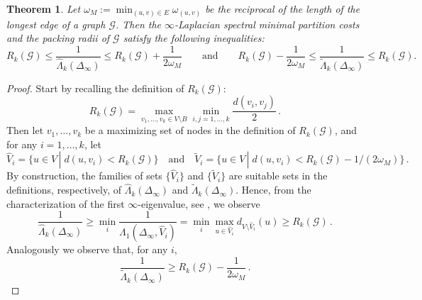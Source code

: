 \documentclass[10pt,a4paper]{amsart}
\newtheorem{theorem}{Theorem}
\newcommand{\Gc}{\mathcal{G}}
\newcommand{\boundary}{B}
\newcommand{\edgelength}{\omega}
\newcommand{\edgeset}{E}
\newcommand{\inflap}{\Delta_{\infty}}
\newcommand{\internalnodes}{\nodeset\setminus\boundary}
\newcommand{\nodeset}{V}
\begin{document}
\begin{theorem}\label{Thm_spectral_min_partitions}
Let $\edgelength_M:=\min_{(u,v)\in\edgeset} \edgelength_{(u,v)}$ be the reciprocal of the length of the longest edge of a graph $\Gc$. Then the $\infty$-Laplacian spectral minimal partition costs and the packing radii of $\Gc$ satisfy the following inequalities:  
%
    $$
    R_k(\Gc) 
 \leq \frac{1}{\widehat{\Lambda}_k(\inflap)}\leq R_k(\Gc)+\frac{1}{2\edgelength_M} 
    \qquad \text{and} \qquad 
 R_k(\Gc)-\frac{1}{2\edgelength_M}\leq\frac{1}{\widetilde{\Lambda}_k(\inflap)}\leq R_k(\Gc).
    $$
\end{theorem}

\begin{proof}
    Start by recalling the definition of $R_k(\Gc)$:
    \begin{equation}
    R_k(\Gc)=\max_{v_1,\dots,v_k\in \internalnodes}\min_{i,j=1,\dots,k} \frac{d(v_i,v_j)}{2}\,.
    \end{equation}
Then let $v_1,\dots,v_k$ be a maximizing set of nodes in the definition of $R_k(\Gc)$, and for any $i=1,\dots,k$, let
%
\begin{equation}
\widehat{V}_i=\{u\in \nodeset\,|\;d(u,v_i)< R_k(\Gc)\} \quad \text{and} \quad \widetilde{V}_i=\{u\in \nodeset\,|\;d(u,v_i)< R_k(\Gc)-1/(2\edgelength_M)\}\,.
\end{equation}
%
By construction, the families of sets $\{\widehat{V}_i\}$ and $\{\widetilde{V}_i\}$ are suitable sets in the definitions, respectively, of $\widehat{\Lambda}_k(\inflap)$ and $\widetilde{\Lambda}_k(\inflap)$. Hence, from the characterization of the first $\infty$-eigenvalue, see , we observe
%
\begin{equation}
\frac{1}{\widehat{\Lambda}_k(\inflap)}\geq \min_i \frac{1}{\Lambda_1(\inflap,\widehat{V}_i)}=\min_i \max_{u\in \widehat{V}_i}d_{\nodeset\setminus \widehat{V}_i}(u)\geq R_k(\Gc)\,.
\end{equation}
%
%
Analogously we observe that, for any $i$, 
%
\begin{equation}
\frac{1}{\widetilde{\Lambda}_k(\inflap)}\geq  R_k(\Gc)- \frac{1}{2\edgelength_M}\,.
\end{equation}
%


\end{proof}
\end{document}
